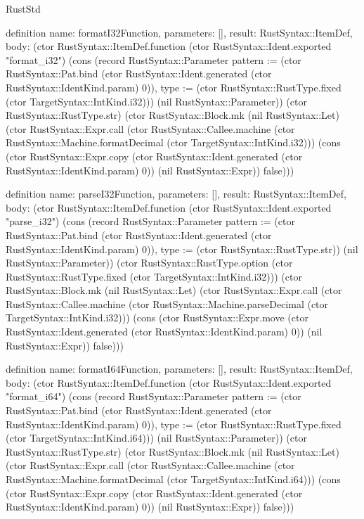 \begin{lexlean}{RustStd}
\begin{semanticmodule}
definition{
  name: formatI32Function,
  parameters: [],
  result: RustSyntax::ItemDef,
  body: (ctor RustSyntax::ItemDef.function (ctor RustSyntax::Ident.exported "format_i32") (cons (record RustSyntax::Parameter {pattern := (ctor RustSyntax::Pat.bind (ctor RustSyntax::Ident.generated (ctor RustSyntax::IdentKind.param) 0)), type := (ctor RustSyntax::RustType.fixed (ctor TargetSyntax::IntKind.i32))}) (nil RustSyntax::Parameter)) (ctor RustSyntax::RustType.str) (ctor RustSyntax::Block.mk (nil RustSyntax::Let) (ctor RustSyntax::Expr.call (ctor RustSyntax::Callee.machine (ctor RustSyntax::Machine.formatDecimal (ctor TargetSyntax::IntKind.i32))) (cons (ctor RustSyntax::Expr.copy (ctor RustSyntax::Ident.generated (ctor RustSyntax::IdentKind.param) 0)) (nil RustSyntax::Expr)) false)))
}

definition{
  name: parseI32Function,
  parameters: [],
  result: RustSyntax::ItemDef,
  body: (ctor RustSyntax::ItemDef.function (ctor RustSyntax::Ident.exported "parse_i32") (cons (record RustSyntax::Parameter {pattern := (ctor RustSyntax::Pat.bind (ctor RustSyntax::Ident.generated (ctor RustSyntax::IdentKind.param) 0)), type := (ctor RustSyntax::RustType.str)}) (nil RustSyntax::Parameter)) (ctor RustSyntax::RustType.option (ctor RustSyntax::RustType.fixed (ctor TargetSyntax::IntKind.i32))) (ctor RustSyntax::Block.mk (nil RustSyntax::Let) (ctor RustSyntax::Expr.call (ctor RustSyntax::Callee.machine (ctor RustSyntax::Machine.parseDecimal (ctor TargetSyntax::IntKind.i32))) (cons (ctor RustSyntax::Expr.move (ctor RustSyntax::Ident.generated (ctor RustSyntax::IdentKind.param) 0)) (nil RustSyntax::Expr)) false)))
}

definition{
  name: formatI64Function,
  parameters: [],
  result: RustSyntax::ItemDef,
  body: (ctor RustSyntax::ItemDef.function (ctor RustSyntax::Ident.exported "format_i64") (cons (record RustSyntax::Parameter {pattern := (ctor RustSyntax::Pat.bind (ctor RustSyntax::Ident.generated (ctor RustSyntax::IdentKind.param) 0)), type := (ctor RustSyntax::RustType.fixed (ctor TargetSyntax::IntKind.i64))}) (nil RustSyntax::Parameter)) (ctor RustSyntax::RustType.str) (ctor RustSyntax::Block.mk (nil RustSyntax::Let) (ctor RustSyntax::Expr.call (ctor RustSyntax::Callee.machine (ctor RustSyntax::Machine.formatDecimal (ctor TargetSyntax::IntKind.i64))) (cons (ctor RustSyntax::Expr.copy (ctor RustSyntax::Ident.generated (ctor RustSyntax::IdentKind.param) 0)) (nil RustSyntax::Expr)) false)))
}


\end{semanticmodule}
\end{lexlean}
